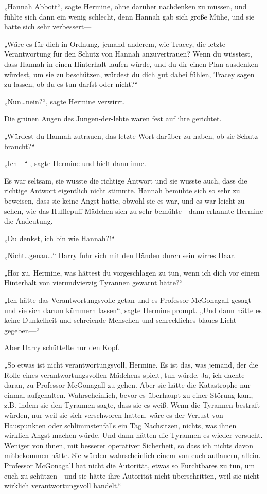 {„Hannah Abbott“, sagte Hermine, ohne darüber nachdenken zu müssen, und fühlte sich dann ein wenig schlecht, denn Hannah gab sich große Mühe, und sie hatte sich sehr verbessert—

„Wäre es für dich in Ordnung, jemand anderem, wie Tracey, die letzte Verantwortung für den Schutz von Hannah anzuvertrauen? Wenn du wüsstest, dass Hannah in einen Hinterhalt laufen würde, und du dir einen Plan ausdenken würdest, um sie zu beschützen, würdest du dich gut dabei fühlen, Tracey sagen zu lassen, ob du es tun darfst oder nicht?“

„Nun…nein?“, sagte Hermine verwirrt.

Die grünen Augen des Jungen-der-lebte waren fest auf ihre gerichtet.

„Würdest du Hannah zutrauen, das letzte Wort darüber zu haben, ob sie Schutz braucht?“

„Ich—“ , sagte Hermine und hielt dann inne.

Es war seltsam, sie wusste die richtige Antwort und sie wusste auch, dass die richtige Antwort eigentlich nicht stimmte. Hannah bemühte sich so sehr zu beweisen, dass sie keine Angst hatte, obwohl sie es war, und es war leicht zu sehen, wie das Hufflepuff-Mädchen sich zu sehr bemühte - dann erkannte Hermine die Andeutung.

„Du denkst, ich bin wie Hannah?!“

„Nicht…genau…“ Harry fuhr sich mit den Händen durch sein wirres Haar.

„Hör zu, Hermine, was hättest du vorgeschlagen zu tun, wenn ich dich vor einem Hinterhalt von vierundvierzig Tyrannen gewarnt hätte?“

„Ich hätte das Verantwortungsvolle getan und es Professor McGonagall gesagt und sie sich darum kümmern lassen“, sagte Hermine prompt. „Und dann hätte es keine Dunkelheit und schreiende Menschen und schreckliches blaues Licht gegeben—“

Aber Harry schüttelte nur den Kopf.

„So etwas ist nicht verantwortungsvoll, Hermine. Es ist das, was jemand, der die Rolle eines verantwortungsvollen Mädchens spielt, tun würde. Ja, ich dachte daran, zu Professor McGonagall zu gehen. Aber sie hätte die Katastrophe nur einmal aufgehalten. Wahrscheinlich, bevor es überhaupt zu einer Störung kam, z.B. indem sie den Tyrannen sagte, dass sie es weiß. Wenn die Tyrannen bestraft würden, nur weil sie sich verschworen hatten, wäre es der Verlust von Hauspunkten oder schlimmstenfalls ein Tag Nachsitzen, nichts, was ihnen wirklich Angst machen würde. Und dann hätten die Tyrannen es wieder versucht. Weniger von ihnen, mit besserer operativer Sicherheit, so dass ich nichts davon mitbekommen hätte. Sie würden wahrscheinlich einem von euch auflauern, allein. Professor McGonagall hat nicht die Autorität, etwas so Furchtbares zu tun, um euch zu schützen - und sie hätte ihre Autorität nicht überschritten, weil sie nicht wirklich verantwortungsvoll handelt.“

}
